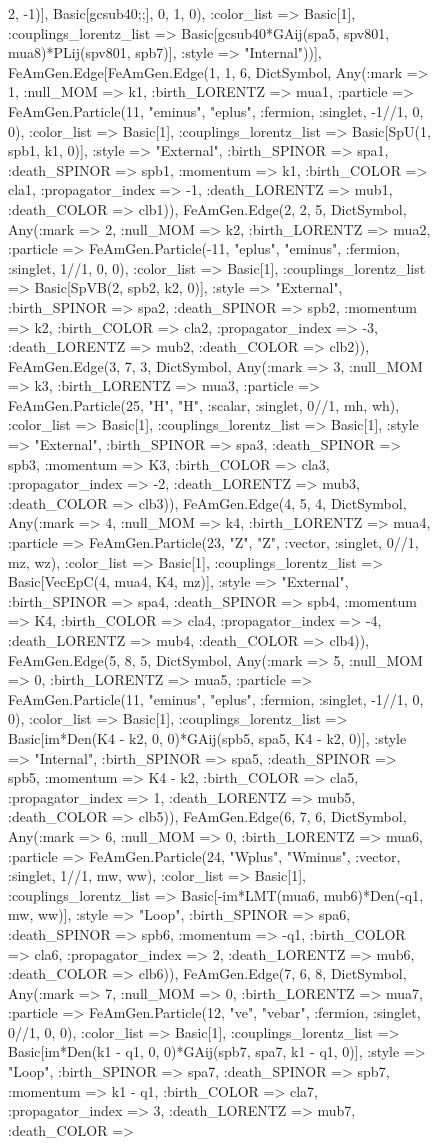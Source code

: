\documentclass{revtex4}
\begin{document}
\begin{figure}[!htb]
\begin{center}
{2, -1)], Basic[gcsub40;;], 0, 1, 0), :color_list => Basic[1], :couplings_lorentz_list => Basic[gcsub40*GAij(spa5, spv801, mua8)*PLij(spv801, spb7)], :style => "Internal"))], FeAmGen.Edge[FeAmGen.Edge(1, 1, 6, Dict{Symbol, Any}(:mark => 1, :null_MOM => k1, :birth_LORENTZ => mua1, :particle => FeAmGen.Particle(11, "eminus", "eplus", :fermion, :singlet, -1//1, 0, 0), :color_list => Basic[1], :couplings_lorentz_list => Basic[SpU(1, spb1, k1, 0)], :style => "External", :birth_SPINOR => spa1, :death_SPINOR => spb1, :momentum => k1, :birth_COLOR => cla1, :propagator_index => -1, :death_LORENTZ => mub1, :death_COLOR => clb1)), FeAmGen.Edge(2, 2, 5, Dict{Symbol, Any}(:mark => 2, :null_MOM => k2, :birth_LORENTZ => mua2, :particle => FeAmGen.Particle(-11, "eplus", "eminus", :fermion, :singlet, 1//1, 0, 0), :color_list => Basic[1], :couplings_lorentz_list => Basic[SpVB(2, spb2, k2, 0)], :style => "External", :birth_SPINOR => spa2, :death_SPINOR => spb2, :momentum => k2, :birth_COLOR => cla2, :propagator_index => -3, :death_LORENTZ => mub2, :death_COLOR => clb2)), FeAmGen.Edge(3, 7, 3, Dict{Symbol, Any}(:mark => 3, :null_MOM => k3, :birth_LORENTZ => mua3, :particle => FeAmGen.Particle(25, "H", "H", :scalar, :singlet, 0//1, mh, wh), :color_list => Basic[1], :couplings_lorentz_list => Basic[1], :style => "External", :birth_SPINOR => spa3, :death_SPINOR => spb3, :momentum => K3, :birth_COLOR => cla3, :propagator_index => -2, :death_LORENTZ => mub3, :death_COLOR => clb3)), FeAmGen.Edge(4, 5, 4, Dict{Symbol, Any}(:mark => 4, :null_MOM => k4, :birth_LORENTZ => mua4, :particle => FeAmGen.Particle(23, "Z", "Z", :vector, :singlet, 0//1, mz, wz), :color_list => Basic[1], :couplings_lorentz_list => Basic[VecEpC(4, mua4, K4, mz)], :style => "External", :birth_SPINOR => spa4, :death_SPINOR => spb4, :momentum => K4, :birth_COLOR => cla4, :propagator_index => -4, :death_LORENTZ => mub4, :death_COLOR => clb4)), FeAmGen.Edge(5, 8, 5, Dict{Symbol, Any}(:mark => 5, :null_MOM => 0, :birth_LORENTZ => mua5, :particle => FeAmGen.Particle(11, "eminus", "eplus", :fermion, :singlet, -1//1, 0, 0), :color_list => Basic[1], :couplings_lorentz_list => Basic[im*Den(K4 - k2, 0, 0)*GAij(spb5, spa5, K4 - k2, 0)], :style => "Internal", :birth_SPINOR => spa5, :death_SPINOR => spb5, :momentum => K4 - k2, :birth_COLOR => cla5, :propagator_index => 1, :death_LORENTZ => mub5, :death_COLOR => clb5)), FeAmGen.Edge(6, 7, 6, Dict{Symbol, Any}(:mark => 6, :null_MOM => 0, :birth_LORENTZ => mua6, :particle => FeAmGen.Particle(24, "Wplus", "Wminus", :vector, :singlet, 1//1, mw, ww), :color_list => Basic[1], :couplings_lorentz_list => Basic[-im*LMT(mua6, mub6)*Den(-q1, mw, ww)], :style => "Loop", :birth_SPINOR => spa6, :death_SPINOR => spb6, :momentum => -q1, :birth_COLOR => cla6, :propagator_index => 2, :death_LORENTZ => mub6, :death_COLOR => clb6)), FeAmGen.Edge(7, 6, 8, Dict{Symbol, Any}(:mark => 7, :null_MOM => 0, :birth_LORENTZ => mua7, :particle => FeAmGen.Particle(12, "ve", "vebar", :fermion, :singlet, 0//1, 0, 0), :color_list => Basic[1], :couplings_lorentz_list => Basic[im*Den(k1 - q1, 0, 0)*GAij(spb7, spa7, k1 - q1, 0)], :style => "Loop", :birth_SPINOR => spa7, :death_SPINOR => spb7, :momentum => k1 - q1, :birth_COLOR => cla7, :propagator_index => 3, :death_LORENTZ => mub7, :death_COLOR => }
\end{center}
\end{figure}
\end{document}
